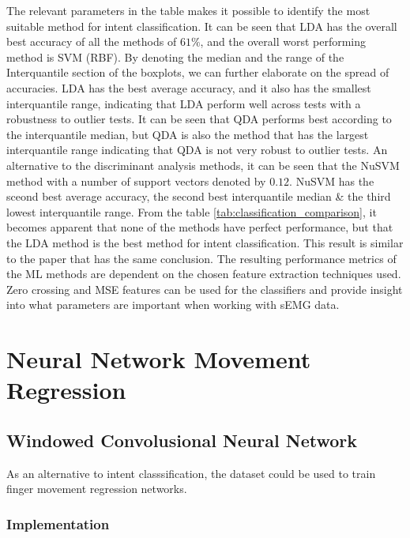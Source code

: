 \documentclass[../main.tex]{subfiles}
\begin{document}
The relevant parameters in the table makes it possible to identify the most suitable method for intent classification.
It can be seen that LDA has the overall best accuracy of all the methods of $61\%$, and the overall worst performing method is SVM (RBF).
By denoting the median and the range of the Interquantile section of the boxplots, we can further elaborate on the spread of accuracies.
LDA has the best average accuracy, and it also has the smallest interquantile range, indicating that LDA perform well across tests with a robustness to outlier tests. 
It can be seen that QDA performs best according to the interquantile median, but QDA is also the method that has the largest interquantile range indicating that QDA is not very robust to outlier tests.
An alternative to the discriminant analysis methods, it can be seen that the NuSVM method with a number of support vectors denoted by $0.12$.
NuSVM has the sceond best average accuracy, the second best interquantile median \& the third lowest interquantile range.
From the table \ref{tab:classification_comparison}, it becomes apparent that none of the methods have perfect performance, but that the LDA method is the best method for intent classification.
This result is similar to the paper \cite{??} that has the same conclusion.
The resulting performance metrics of the ML methods are dependent on the chosen feature extraction techniques used.
Zero crossing and MSE features can be used for the classifiers and provide insight into what parameters are important when working with sEMG data.

\newpage
\section{Neural Network Movement Regression}

\subsection{Windowed Convolusional Neural Network}

As an alternative to intent classsification, the dataset could be used to train finger movement regression networks.

\subsubsection{Implementation}
\end{document}

